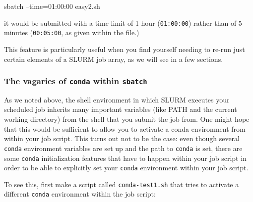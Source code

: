 \documentclass[]{krantz}
\makeatletter
\newenvironment{Shaded}{\begin{snugshade}}{\end{snugshade}}
\newcommand{\BuiltInTok}[1]{#1}
\newcommand{\CommentTok}[1]{\textcolor[rgb]{0.37,0.37,0.37}{\textit{#1}}}
\newcommand{\ExtensionTok}[1]{#1}
\newcommand{\FunctionTok}[1]{\textcolor[rgb]{0,0,0}{#1}}
\newcommand{\NormalTok}[1]{#1}
\newcommand{\StringTok}[1]{\textcolor[rgb]{0.5,0.5,0.5}{#1}}
\newcommand{\VariableTok}[1]{\textcolor[rgb]{0,0,0}{#1}}
\newenvironment{kframe}{%
\medskip{}
\setlength{\fboxsep}{.8em}
 \def\at@end@of@kframe{}%
 \ifinner\ifhmode%
  \def\at@end@of@kframe{\end{minipage}}%
  \begin{minipage}{\columnwidth}%
 \fi\fi%
 \def\FrameCommand##1{\hskip\@totalleftmargin \hskip-\fboxsep
 \colorbox{shadecolor}{##1}\hskip-\fboxsep
     \hskip-\linewidth \hskip-\@totalleftmargin \hskip\columnwidth}%
 \MakeFramed {\advance\hsize-\width
   \@totalleftmargin\z@ \linewidth\hsize
   \@setminipage}}%
 {\par\unskip\endMakeFramed%
 \at@end@of@kframe}
\renewenvironment{Shaded}{\begin{kframe}}{\end{kframe}}
\makeatother
\begin{document}
\begin{Shaded}
\begin{Highlighting}[]
\ExtensionTok{sbatch}\NormalTok{ --time=01:00:00 easy2.sh}
\end{Highlighting}
\end{Shaded}

it would be submitted with a time limit of 1 hour (\texttt{01:00:00}) rather
than of 5 minutes (\texttt{00:05:00}, as given within the file.)

This feature is particularly useful when you find yourself needing
to re-run just certain elements of a SLURM job array, as we will see in a few sections.

\hypertarget{the-vagaries-of-conda-within-sbatch}{%
\subsubsection{\texorpdfstring{The vagaries of \texttt{conda} within \texttt{sbatch}}{The vagaries of conda within sbatch}}\label{the-vagaries-of-conda-within-sbatch}}

As we noted above, the shell environment in which SLURM executes
your scheduled job inherits many important variables (like PATH and
the current working directory) from the shell that you submit the job from.
One might hope that this would be sufficient to allow you to activate
a conda environment from within your job script. This turns out not to be
the case: even though several \texttt{conda} environment variables are set up
and the path to \texttt{conda} is set, there are some \texttt{conda} initialization
features that have to happen within your job script in order to be able to
explicitly set your \texttt{conda} environment within your job script.

To see this, first make a script called \texttt{conda-test1.sh} that
tries to activate a different \texttt{conda} environment within the job script:

\begin{Shaded}
\end{Shaded}
\end{document}
